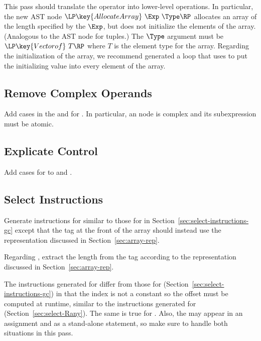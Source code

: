 \documentclass[11pt]{book}
\begin{document}
This pass should translate the  operator into
lower-level operations. In particular, the new AST node
$\LP\key{AllocateArray}~\Exp~\Type\RP$ allocates an array of the
length specified by the $\Exp$, but does not initialize the elements
of the array. (Analogous to the  AST node for tuples.)
The $\Type$ argument must be $\LP\key{Vectorof}~T\RP$ where $T$ is the
element type for the array. Regarding the initialization of the array,
we recommend generated a  loop that uses
 to put the initializing value into every element of
the array.

\subsection{Remove Complex Operands}

Add cases in the  and  for
. In particular, an  node is
complex and its subexpression must be atomic.

\subsection{Explicate Control}

Add cases for  to  and
.

\subsection{Select Instructions}

Generate instructions for  similar to those for
 in Section~\ref{sec:select-instructions-gc} except
that the tag at the front of the array should instead use the
representation discussed in Section~\ref{sec:array-rep}.

Regarding , extract the length from the tag
according to the representation discussed in
Section~\ref{sec:array-rep}.

The instructions generated for  differ from those
for  (Section~\ref{sec:select-instructions-gc}) in
that the index is not a constant so the offset must be computed at
runtime, similar to the instructions generated for
 (Section~\ref{sec:select-Rany}).  The same is
true for .  Also, the  may
appear in an assignment and as a stand-alone statement, so make sure
to handle both situations in this pass.
\end{document}
